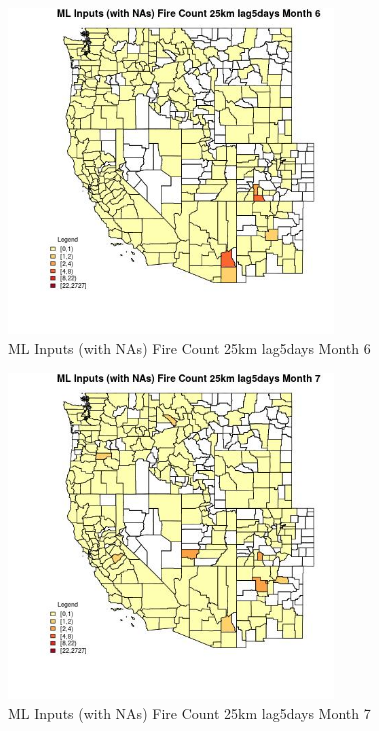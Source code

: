 \begin{figure} 
\centering  
\includegraphics[width=0.77\textwidth]{Code_Outputs/Report_ML_input_PM25_Step4_part_f_de_duplicated_aves_prioritize_24hr_obswNAs_CountyFire_Count_25km_lag5daysmedianMonth6.jpg} 
\caption{\label{fig:Report_ML_input_PM25_Step4_part_f_de_duplicated_aves_prioritize_24hr_obswNAsCountyFire_Count_25km_lag5daysmedianMonth6}ML Inputs (with NAs) Fire Count 25km lag5days Month 6} 
\end{figure} 
 

\begin{figure} 
\centering  
\includegraphics[width=0.77\textwidth]{Code_Outputs/Report_ML_input_PM25_Step4_part_f_de_duplicated_aves_prioritize_24hr_obswNAs_CountyFire_Count_25km_lag5daysmedianMonth7.jpg} 
\caption{\label{fig:Report_ML_input_PM25_Step4_part_f_de_duplicated_aves_prioritize_24hr_obswNAsCountyFire_Count_25km_lag5daysmedianMonth7}ML Inputs (with NAs) Fire Count 25km lag5days Month 7} 
\end{figure} 
 

